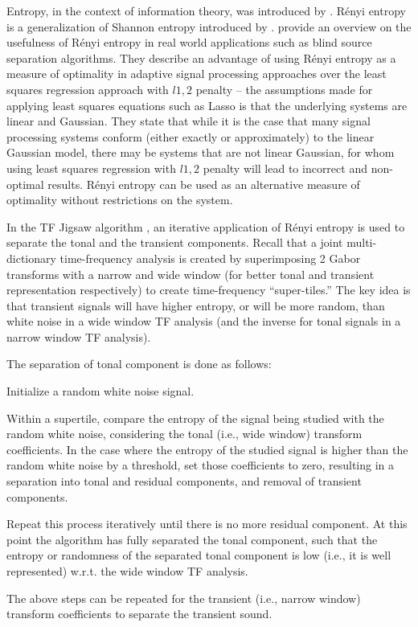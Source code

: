 \documentclass[letter,12pt]{article}
\newenvironment{tight_enumerate}{
\begin{enumerate}
  \setlength{\itemsep}{0pt}
  \setlength{\parskip}{0pt}
}{\end{enumerate}}
\begin{document}
Entropy, in the context of information theory, was introduced by \citet{shannon1948}. R{\'e}nyi entropy is a generalization of Shannon entropy introduced by \citet{renyi}. \citet{entropy} provide an overview on the usefulness of R{\'e}nyi entropy in real world applications such as blind source separation algorithms. They describe an advantage of using R{\'e}nyi entropy as a measure of optimality in adaptive signal processing approaches over the least squares regression approach with $l1,2$ penalty -- the assumptions made for applying least squares equations such as Lasso is that the underlying systems are linear and Gaussian. They state that while it is the case that many signal processing systems conform (either exactly or approximately) to the linear Gaussian model, there may be systems that are not linear Gaussian, for whom using least squares regression with $l1,2$ penalty will lead to incorrect and non-optimal results. R{\'e}nyi entropy can be used as an alternative measure of optimality without restrictions on the system.

In the TF Jigsaw algorithm \cite{tfjigsaw}, an iterative application of R{\'e}nyi entropy is used to separate the tonal and the transient components. Recall that a joint multi-dictionary time-frequency analysis is created by superimposing 2 Gabor transforms with a narrow and wide window (for better tonal and transient representation respectively) to create time-frequency ``super-tiles.'' The key idea is that transient signals will have higher entropy, or will be more random, than white noise in a wide window TF analysis (and the inverse for tonal signals in a narrow window TF analysis).

The separation of tonal component is done as follows:

\begin{tight_enumerate}
	\item
		Initialize a random white noise signal.
	\item
		Within a supertile, compare the entropy of the signal being studied with the random white noise, considering the tonal (i.e., wide window) transform coefficients. In the case where the entropy of the studied signal is higher than the random white noise by a threshold, set those coefficients to zero, resulting in a separation into tonal and residual components, and removal of transient components.
	\item
		Repeat this process iteratively until there is no more residual component. At this point the algorithm has fully separated the tonal component, such that the entropy or randomness of the separated tonal component is low (i.e., it is well represented) w.r.t. the wide window TF analysis.
	\item
		The above steps can be repeated for the transient (i.e., narrow window) transform coefficients to separate the transient sound.
\end{tight_enumerate}
\end{document}
